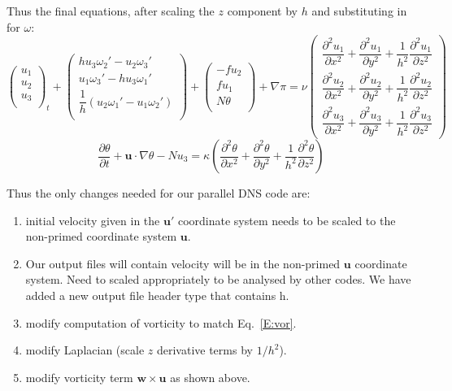 \documentclass[12pt]{article}
\newcommand{\uv}{\mathbf u}
\newcommand{\up}{\mathbf u'}
\newcommand{\w}{\mathbf w}
\newcommand{\grad}{\nabla}
\begin{document}
Thus the final equations, after scaling the $z$ component by $h$
and substituting in for $\omega$:
\[
\begin{pmatrix} u_1 \\
                u_2 \\
                u_3 \\
\end{pmatrix}_t
  + 
\begin{pmatrix}  h  u_3 \omega_2' -  u_2 \omega_3'   \\
                   u_1 \omega_3' -   h u_3 \omega_1'   \\
              \dfrac{1}{h} \left(  u_2 \omega_1' - u_1 \omega_2' \right)  \\
\end{pmatrix}  
+ 
\begin{pmatrix} -f u_2 \\
                f u_1 \\
                N \theta  \\
\end{pmatrix}  
+ \grad \pi = \nu 
\begin{pmatrix} \dfrac{\partial^2 u_1}{\partial x^2} + 
                \dfrac{\partial^2 u_1}{\partial y^2} + 
                \dfrac{1}{h^2}\dfrac{\partial^2 u_1}{\partial z^2}   \\[5mm]
                \dfrac{\partial^2 u_2}{\partial x^2} + 
                \dfrac{\partial^2 u_2}{\partial y^2} + 
                \dfrac{1}{h^2}\dfrac{\partial^2 u_2}{\partial z^2}   \\[5mm]
                \dfrac{\partial^2 u_3}{\partial x^2} + 
                \dfrac{\partial^2 u_3}{\partial y^2} + 
                \dfrac{1}{h^2}\dfrac{\partial^2 u_3}{\partial z^2}
\end{pmatrix}
\]
\[
\frac{ \partial  \theta }{\partial t}  + \uv \cdot \grad \theta - 
N u_3  = \kappa \left(
                \dfrac{\partial^2 \theta}{\partial x^2} + 
                \dfrac{\partial^2 \theta}{\partial y^2} + 
                \dfrac{1}{h^2}\dfrac{\partial^2 \theta}{\partial z^2}
\right)
\]



Thus the only changes needed for our parallel DNS code are:
\begin{enumerate}
\item initial velocity given in the $\up$ coordinate system 
needs to be scaled to the non-primed coordinate system $\uv$.
\item Our output files will contain velocity will be in the non-primed 
$\uv$ coordinate system.  Need to scaled appropriately  to be analysed
by other codes.  We have added a new output file header type that
contains h.  
\item modify computation of vorticity to match Eq.~\ref{E:vor}.
\item modify Laplacian (scale $z$ derivative terms by $1/h^2$).
\item modify vorticity term $\w \times \uv$ as shown above.
\end{enumerate}
\end{document}
